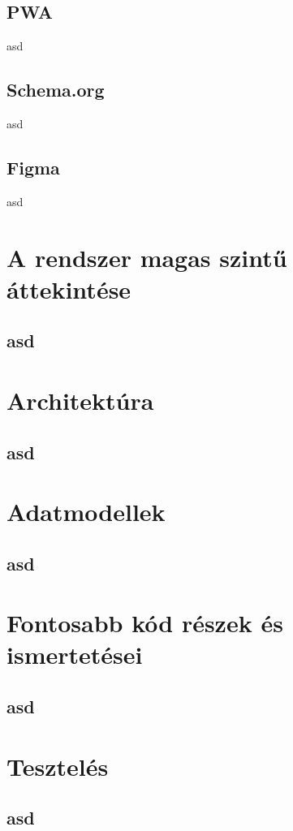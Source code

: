 \documentclass[12pt]{report}
\theoremstyle{definition}
\begin{document}
\section{PWA}
asd

\section{Schema.org}
asd

\section{Figma}
asd

\chapter{A rendszer magas szintű áttekintése}
\section{asd}


\chapter{Architektúra}
\section{asd}


\chapter{Adatmodellek}
\section{asd}


\chapter{Fontosabb kód részek és ismertetései}
\section{asd}


\chapter{Tesztelés}
\section{asd}
\end{document}
